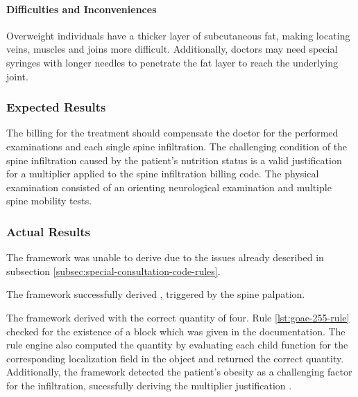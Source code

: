 \paragraph{Difficulties and Inconveniences}
Overweight individuals have a thicker layer of subcutaneous fat, making locating veins, muscles and joins more difficult.
Additionally, doctors may need special syringes with longer needles to penetrate the fat layer to reach the underlying joint.


\subsubsection{Expected Results}
The billing for the treatment should compensate the doctor for the performed examinations and each single spine infiltration.
The challenging condition of the spine infiltration caused by the patient's nutrition status is a valid justification for a multiplier applied to the spine infiltration billing code.
The physical examination consisted of an orienting neurological examination and multiple spine mobility tests.


\subsubsection{Actual Results}
The framework was unable to derive  due to the issues already described in subsection \ref{subsec:special-consultation-code-rules}.

The framework successfully derived , triggered by the spine palpation.

The framework derived  with the correct quantity of four.
Rule \ref{lst:goae-255-rule} checked for the existence of a  block which was given in the documentation.
The rule engine also computed the quantity by evaluating each child function for the corresponding localization field in the  object and returned the correct quantity.
Additionally, the framework detected the patient's obesity as a challenging factor for the infiltration,
sucessfully deriving the multiplier justification \addref.







